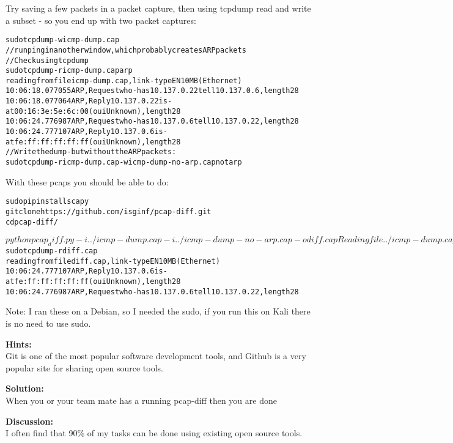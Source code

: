 \documentclass[a4paper,11pt,notitlepage]{report}
\begin{document}
Try saving a few packets in a packet capture, then using tcpdump read and write a subset - so you end up with two packet captures:
\begin{alltt}\footnotesize
sudo tcpdump -w icmp-dump.cap
// run ping in another window, which probably creates ARP packets
// Check using tcpdump
sudo tcpdump -r icmp-dump.cap arp
reading from file icmp-dump.cap, link-type EN10MB (Ethernet)
10:06:18.077055 ARP, Request who-has 10.137.0.22 tell 10.137.0.6, length 28
10:06:18.077064 ARP, Reply 10.137.0.22 is-at 00:16:3e:5e:6c:00 (oui Unknown), length 28
10:06:24.776987 ARP, Request who-has 10.137.0.6 tell 10.137.0.22, length 28
10:06:24.777107 ARP, Reply 10.137.0.6 is-at fe:ff:ff:ff:ff:ff (oui Unknown), length 28
// Write the dump - but without the ARP packets:
sudo tcpdump -r icmp-dump.cap -w icmp-dump-no-arp.cap not arp
\end{alltt}

With these pcaps you should be able to do:
\begin{alltt}\footnotesize
sudo pip install scapy
git clone https://github.com/isginf/pcap-diff.git
cd pcap-diff/

$ python pcap_diff.py -i ../icmp-dump.cap -i ../icmp-dump-no-arp.cap -o diff.cap
Reading file ../icmp-dump.cap:
Found 23 packets

Reading file ../icmp-dump-no-arp.cap:
Found 19 packets

Diffing packets:

Found 2 different packets

Writing diff.cap
// Try reading the output packet diff:

$ sudo tcpdump -r diff.cap
reading from file diff.cap, link-type EN10MB (Ethernet)
10:06:24.777107 ARP, Reply 10.137.0.6 is-at fe:ff:ff:ff:ff:ff (oui Unknown), length 28
10:06:24.776987 ARP, Request who-has 10.137.0.6 tell 10.137.0.22, length 28
\end{alltt}

Note: I ran these on a Debian, so I needed the sudo, if you run this on Kali there is no need to use sudo.

{\bf Hints:}\\
Git is one of the most popular software development tools, and Github is a very popular site for sharing open source tools.

{\bf Solution:}\\
When you or your team mate has a running pcap-diff then you are done

{\bf Discussion:}\\
I often find that 90\% of my tasks can be done using existing open source tools.
\end{document}
